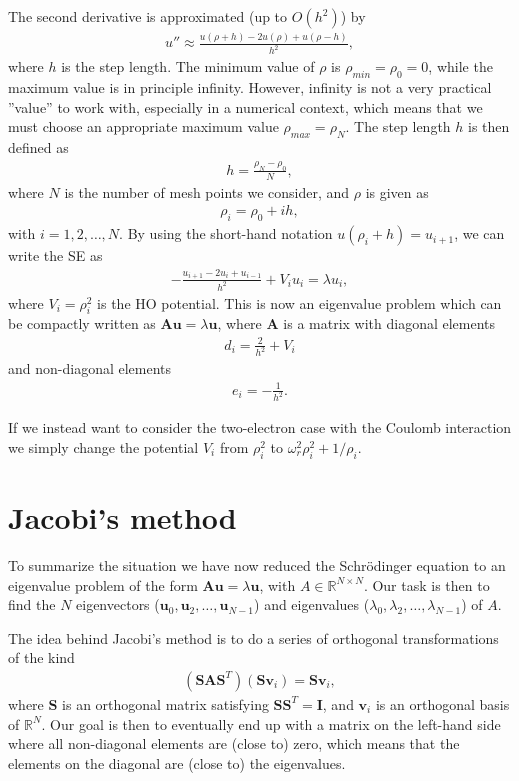 \documentclass[12pt, a4paper]{article}
\begin{document}
The second derivative is approximated (up to $O(h^2)$) by 
\begin{align*}
u'' \approx \frac{u(\rho + h) - 2u(\rho) + u(\rho - h)}{h^2},  
\end{align*}
where $h$ is the step length. The minimum value of $\rho$ is $\rho_{min} = \rho_0 = 0$, while the 
maximum value is in principle infinity. However, infinity is not a very practical ''value'' to work with,
especially in a numerical context, which means that we must choose an appropriate maximum value 
$\rho_{max} = \rho_N$. The step length $h$ is then defined as 
\begin{align*}
h = \frac{\rho_N - \rho_0}{N}, 
\end{align*} 
where $N$ is the number of mesh points we consider, and $\rho$ is given as 
\begin{align*}
\rho_i = \rho_0 + ih, 
\end{align*}
with $i = 1,2,\dots,N$. By using the short-hand notation $u(\rho_i + h) = u_{i+1}$, we can write the 
SE as 
\begin{align}
- \frac{u_{i+1} - 2u_i + u_{i-1}}{h^2} + V_iu_i = \lambda u_i, 
\end{align}
where $V_i = \rho_i^2$ is the HO potential. This is now an eigenvalue problem which can be compactly 
written as $\mathbf{Au} = \lambda\mathbf{u}$, where $\mathbf{A}$ is a matrix with diagonal elements 
\begin{align*}
d_i = \frac{2}{h^2} + V_i
\end{align*}
and non-diagonal elements 
\begin{align*}
e_i = -\frac{1}{h^2}. 
\end{align*} 

If we instead want to consider the two-electron case with the Coulomb interaction we simply change 
the potential $V_i$ from $\rho_i^2$ to $\omega_r^2\rho_i^2 + 1/\rho_i$. 

\section{Jacobi's method}

To summarize the situation we have now reduced the Schrödinger equation to an eigenvalue problem of 
the form $\mathbf{Au} = \lambda\mathbf{u}$, with $A\in \mathbb{R}^{N\times N}$. Our task is then to find 
the $N$ eigenvectors ($\mathbf{u}_0, \mathbf{u}_2,\dots,\mathbf{u}_{N-1}$) and eigenvalues 
($\lambda_0,\lambda_2,\dots,\lambda_{N-1}$) of $A$. 

The idea behind Jacobi's method is to do a series of orthogonal transformations of the kind 
\begin{align*}
(\mathbf{SAS}^T)(\mathbf{Sv}_i) = \mathbf{Sv}_i, 
\end{align*}
where $\mathbf{S}$ is an orthogonal matrix satisfying $\mathbf{SS}^T = \mathbf{I}$, and $\mathbf{v}_i$ is 
an orthogonal basis of $\mathbb{R}^N$. Our goal is then to eventually end up with a matrix on the 
left-hand side where all non-diagonal elements are (close to) zero, which means that the elements on the 
diagonal are (close to) the eigenvalues. 
\end{document}
